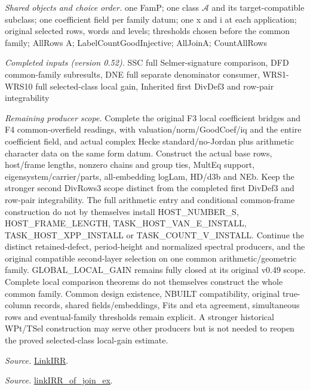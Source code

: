 \emph{Shared objects and choice order.} one FamP; one class $\mathcal A$ and its target-compatible subclass; one coefficient field per family datum; one x and i at each application; original selected rows, words and levels; thresholds chosen before the common family; AllRows A; LabelCountGoodInjective; AllJoinA; CountAllRows

\emph{Completed inputs (version 0.52).} SSC full Selmer-signature comparison, DFD common-family subresults, DNE full separate denominator consumer, WRS1-WRS10 full selected-class local gain, Inherited first DivDef3 and row-pair integrability

\emph{Remaining producer scope.} Complete the original F3 local coefficient bridges and F4 common-overfield readings, with valuation/norm/GoodCoef/iq and the entire coefficient field, and actual complex Hecke standard/no-Jordan plus arithmetic character data on the same form datum. Construct the actual base rows, host/frame lengths, nonzero chains and group ties, MultEq support, eigensystem/carrier/parts, all-embedding logLam, HD/d3b and NEb. Keep the stronger second DivRows3 scope distinct from the completed first DivDef3 and row-pair integrability. The full arithmetic entry and conditional common-frame construction do not by themselves install HOST\_\allowbreak NUMBER\_\allowbreak S, HOST\_\allowbreak FRAME\_\allowbreak LENGTH, TASK\_\allowbreak HOST\_\allowbreak VAN\_\allowbreak E\_\allowbreak INSTALL, TASK\_\allowbreak HOST\_\allowbreak XPP\_\allowbreak INSTALL or TASK\_\allowbreak COUNT\_\allowbreak V\_\allowbreak INSTALL. Continue the distinct retained-defect, period-height and normalized spectral producers, and the original compatible second-layer selection on one common arithmetic/geometric family. GLOBAL\_\allowbreak LOCAL\_\allowbreak GAIN remains fully closed at its original v0.49 scope. Complete local comparison theorems do not themselves construct the whole common family. Common design existence, NBUILT compatibility, original true-column records, shared fields/embeddings, Fits and eta agreement, simultaneous rows and eventual-family thresholds remain explicit. A stronger historical WPt/TSel construction may serve other producers but is not needed to reopen the proved selected-class local-gain estimate.

\emph{Source.} \href{https://github.com/CocoSgt/riemann-hypothesis-lean/blob/7cbf7a0c32fca1badf05931879a37c3f8a2b03b4/src/Formalism/SharpRestriction/GlobalTheoremInputs.lean#L55-L58}{LinkIRR}.

\emph{Source.} \href{https://github.com/CocoSgt/riemann-hypothesis-lean/blob/7cbf7a0c32fca1badf05931879a37c3f8a2b03b4/src/Development/AbelianVarietyTheory/Proofs/GlobalInterpolation/LinkIRROfJoinEx.lean#L17-L38}{linkIRR\_\allowbreak of\_\allowbreak join\_\allowbreak ex}.

